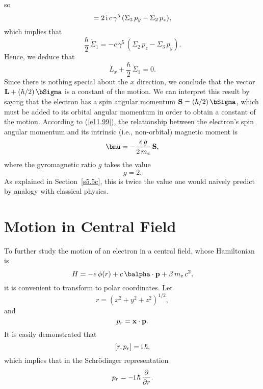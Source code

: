 so
\begin{equation}
[\Sigma_1,H] = 2\,{\rm i}\,c\,\gamma^5\,(\Sigma_3\,p_y-\Sigma_2\,p_z),
\end{equation}
which implies that
\begin{equation}
\frac{\hbar}{2}\,\dot{\Sigma}_1 = -c\,\gamma^5\,(\Sigma_2\,p_z-\Sigma_3\,p_y).
\end{equation}
Hence, we deduce that
\begin{equation}
\dot{L}_x +\frac{\hbar}{2}\,\dot{\Sigma}_1 = 0.
\end{equation}
Since there is nothing special about the $x$ direction, we conclude that the vector ${\bf L} + (\hbar/2)\,\bSigma$ is
a constant of the motion. We can interpret this result by saying that the electron has a spin angular momentum
${\bf S} = (\hbar/2)\,\bSigma$, which must be added to its orbital angular momentum in order to obtain a constant of the motion. 
According to (\ref{e11.99}), the relationship between the electron's spin angular momentum and its intrinsic (i.e., non-orbital) magnetic moment is
\begin{equation}
\bmu = - \frac{e\,g}{2\,m_e}\,{\bf S},
\end{equation}
where the gyromagnetic ratio $g$ takes the value
\begin{equation}
g= 2.
\end{equation}
As explained in Section~\ref{s5.5c}, this is twice the value one would naively predict by analogy with classical physics. 

\section{Motion in  Central Field}
To further study the motion of an electron in a central field, whose Hamiltonian is
\begin{equation}\label{e11.119}
H = - e\,\phi(r) + c\,\balpha\cdot{\bf p} + \beta\,m_e\,c^2,
\end{equation}
it is convenient to  transform to polar coordinates. Let 
\begin{equation}
r = (x^{2}+y^{2}+z^{2})^{1/2},
\end{equation}
and
\begin{equation}\label{e11.222f}
p_r = {\bf x}\cdot{\bf p}.
\end{equation}
It is easily demonstrated that
\begin{equation}\label{e11.122}
[r,p_r] = {\rm i} \,\hbar,
\end{equation}
which implies that in the Schr\"{o}dinger representation 
\begin{equation}\label{e11.123}
p_r = -{\rm i}\,\hbar\,\frac{\partial}{\partial r}.
\end{equation}


